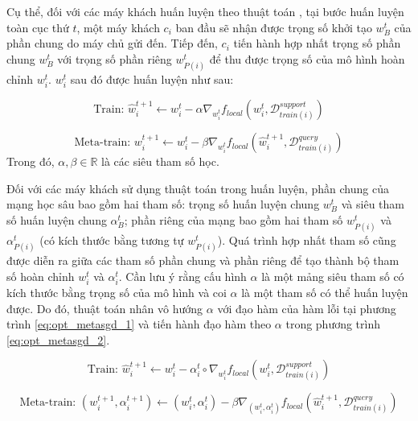 \documentclass[runningheads]{llncs}
\begin{document}
Cụ thể, đối với các máy khách huấn luyện theo thuật toán , tại bước huấn luyện toàn cục thứ $t$, một máy khách $c_i$ ban đầu sẽ nhận được trọng số khởi tạo $w_B^t$ của phần chung do máy chủ gửi đến. Tiếp đến, $c_i$ tiến hành hợp nhất trọng số phần chung $w_B^t$ với trọng số phần riêng $w_{P(i)}^t$ để thu được trọng số của mô hình hoàn chỉnh $w_i^t$. $w_i^t$ sau đó được huấn luyện như sau:

\begin{dmath}
    \text{Train: } \hat{w}_{i}^{t+1} \gets w_{i}^t - \alpha\nabla_{w_i^t} f_{local}\left(w_{i}^t, \mathcal{D}_{train(i)}^{support}\right)
\end{dmath}

\begin{dmath}
    \text{Meta-train: } w_{i}^{t+1} \gets w_{i}^t - \beta\nabla_{w_i^t} f_{local}\left(\hat{w}_{i}^{t+1}, \mathcal{D}_{train(i)}^{query}\right)
\end{dmath} Trong đó, $\alpha, \beta\in \mathbb{R}$ là các siêu tham số học.

Đối với các máy khách sử dụng thuật toán  trong huấn luyện, phần chung của mạng học sâu bao gồm hai tham số: trọng số huấn luyện chung $w_B^{t}$ và siêu tham số huấn luyện chung $\alpha_B^{t}$; phần riêng của mạng bao gồm hai tham số $w_{P(i)}^{t}$ và $\alpha_{P(i)}^{t}$ (có kích thước bằng tương tự $w_{P(i)}^{t}$). Quá trình hợp nhất tham số cũng được diễn ra giữa các tham số phần chung và phần riêng để tạo thành bộ tham số hoàn chỉnh $w_i^t$ và $\alpha_i^t$. Cần lưu ý rằng  cấu hình $\alpha$ là một mảng siêu tham số có kích thước bằng trọng số của mô hình và coi $\alpha$ là một tham số có thể huấn luyện được. Do đó, thuật toán nhân vô hướng $\alpha$ với đạo hàm của hàm lỗi tại phương trình \ref{eq:opt_metasgd_1} và tiến hành đạo hàm theo $\alpha$ trong phương trình \ref{eq:opt_metasgd_2}.

\begin{dmath}
    \label{eq:opt_metasgd_1}
    \text{Train: } \hat{w}_{i}^{t+1} \gets w_{i}^t - \alpha_i^t\circ\nabla_{w_i^t} f_{local}\left(w_{i}^t, \mathcal{D}_{train(i)}^{support}\right)
\end{dmath}

\begin{dmath}
    \label{eq:opt_metasgd_2}
    \text{Meta-train: } (w_{i}^{t+1}, \alpha_i^{t+1}) \gets (w_{i}^t, \alpha_{i}^{t}) - \beta\nabla_{(w_i^t, \alpha_i^t)} f_{local}\left(\hat{w}_{i}^{t+1}, \mathcal{D}_{train(i)}^{query}\right)
\end{dmath}
\end{document}
